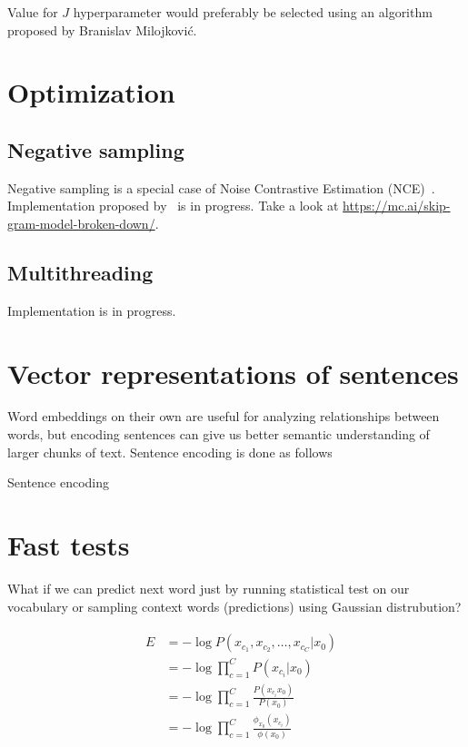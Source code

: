 \documentclass{article}
\newcommand{\SetAlgoStyle}{
	\SetAlgoNoLine
	\SetAlgoNoEnd
	\DontPrintSemicolon
}
\begin{document}
\medbreak

Value for $J$ hyperparameter would preferably be selected using an algorithm proposed by Branislav Milojković.

\section{Optimization}

\subsection{Negative sampling}

Negative sampling is a special case of Noise Contrastive Estimation (NCE)~\cite{1206.6426}.
Implementation proposed by~\cite{1704.03956} is in progress.
Take a look at \url{https://mc.ai/skip-gram-model-broken-down/}.

\subsection{Multithreading}

Implementation is in progress.

\section{Vector representations of sentences}

Word embeddings on their own are useful for analyzing relationships between
words, but encoding sentences can give us better semantic understanding of
larger chunks of text. Sentence encoding is done as follows

\begin{algorithm}[H]
	\caption{Sentence encoding}
	\SetAlgoStyle
\end{algorithm}

\section{Fast tests}

What if we can predict next word just by running statistical test on our vocabulary or
sampling context words (predictions) using Gaussian distrubution?

\begin{align}	
	&\begin{aligned}	
		E &= -\log P(x_{c_1}, x_{c_2},\ldots,x_{c_C}|x_0) \\
		&= -\log \prod_{c=1}^C P(x_{c_i}|x_0) \\
		&= -\log \prod_{c=1}^C \frac{P(x_{c_i}x_0)}{P(x_0)} \\
		&= -\log \prod_{c=1}^C \frac{\phi_{x_0}(x_{c_i})}{\phi(x_0)}
	\end{aligned}
\end{align}
\end{document}
